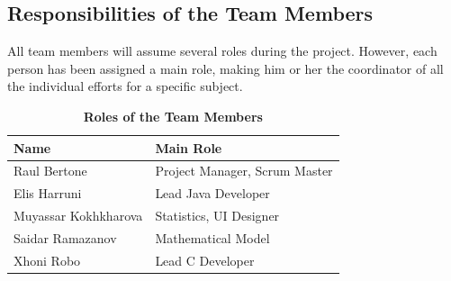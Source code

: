 \documentclass[conference,12pt]{IEEETran}
\begin{document}
\subsection{Responsibilities of the Team Members}

All team members will assume several roles during the project. However, each person has been assigned a main role, making him or her the coordinator of all the individual efforts for a specific subject. 
\FloatBarrier
\begin{table}[h]
	\centering
	\caption{\textbf{Roles of the Team Members}}
	{\renewcommand{\arraystretch}{2}%
		\begin{tabular}{ | l | l | }
			\hline
			\textbf{Name} & \textbf{Main Role} \\ \hline
			Raul Bertone & Project Manager, Scrum Master \\ \hline
			Elis Harruni & Lead Java Developer \\ \hline
			Muyassar Kokhkharova & Statistics, UI Designer \\ \hline
			Saidar Ramazanov & Mathematical Model \\ \hline
			Xhoni Robo & Lead C Developer \\ \hline
	\end{tabular}}
\end{table} 

\clearpage
\FloatBarrier
\end{document}
